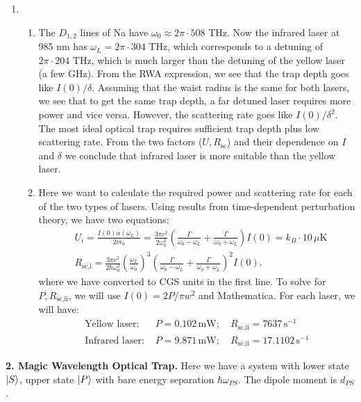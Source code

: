 \documentclass{article}
\theoremstyle{definition}
\newcommand{\al}{\alpha}
\newcommand{\f}[2]{\frac{#1}{#2}}
\newcommand{\lp}{\left(}
\newcommand{\rp}{\right)}
\begin{document}
\begin{enumerate}[label=(\alph*)]
	\item 
	
	\begin{enumerate}[label=(\roman*)]
		\item  The $D_{1,2}$ lines of Na have $\omega_0 \approx 2\pi \cdot 508 $ THz. Now the infrared laser at 985 nm has $\omega_L = 2\pi \cdot 304$ THz, which corresponds to a detuning of $2\pi\cdot 204$ THz, which is much larger than the detuning of the yellow laser (a few GHz). From the RWA expression, we see that the trap depth goes like $I(0)/\delta$. Assuming that the waist radius is the same for both lasers, we see that to get the same trap depth, a far detuned laser requires more power and vice versa. However, the scattering rate goes like $I(0)/\delta^2$. The most ideal optical trap requires sufficient trap depth plus low scattering rate. From the two factors ($U,R_\text{sc}$) and their dependence on $I$ and $\delta$ we conclude that infrared laser is more suitable than the yellow laser. 
		
		\item Here we want to calculate the required power and scattering rate for each of the two types of lasers. Using results from time-dependent perturbation theory, we have two equations:
		\begin{align*}
			&U_i = \f{I(0) \al(\omega_L)}{2c\epsilon_0} =   \f{3\pi c^2}{2\omega_0^3} \lp \f{\Gamma}{\omega_0 - \omega_L} + \f{\Gamma}{\omega_0 + \omega_L}\rp I(0) = k_B \cdot 10 \, \mu\text{K} \\
			& R_\text{sc,i} = \f{3\pi c^2}{2\hbar \omega_0^3}\lp \f{\omega_L}{\omega_0} \rp^3 \lp \f{\Gamma}{\omega_0 - \omega_L} + \f{\Gamma}{\omega_0 + \omega_L} \rp^2 I(0).
		\end{align*}
	where we have converted to CGS units in the first line. To solve for $P,R_{\text{sc,ii}}$, we will use $I(0)=2P/\pi w^2$ and Mathematica. For each laser, we will have:
	\begin{align*}
		\text{Yellow laser: } \,\,& 
		P = 0.102 \,\text{mW}; \quad 
		R_{\text{sc,ii}} = 7637 \,\text{s}^{-1}\\
		\text{Infrared laser:}\,\,&  
		P = 9.871 \, \text{mW}; \quad 
		R_{\text{sc,ii}} = 17.1102 \,\text{s}^{-1}
	\end{align*}

	\end{enumerate}
\end{enumerate}


\noindent \textbf{2. Magic Wavelength Optical Trap.} Here we have a system with lower state $\ket{S}$, upper state $\ket{P}$ with bare energy separation $\hbar \omega_{PS}$. The dipole moment is $d_{PS}$. 
\end{document}
